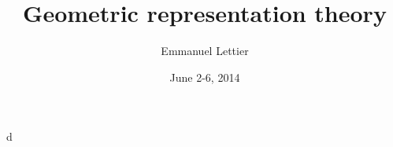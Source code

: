 \documentclass{article}
\title{Geometric representation theory}
\author{Emmanuel Lettier}
\date{June 2-6, 2014}
\begin{document}
\maketitle





d
\end{document}
